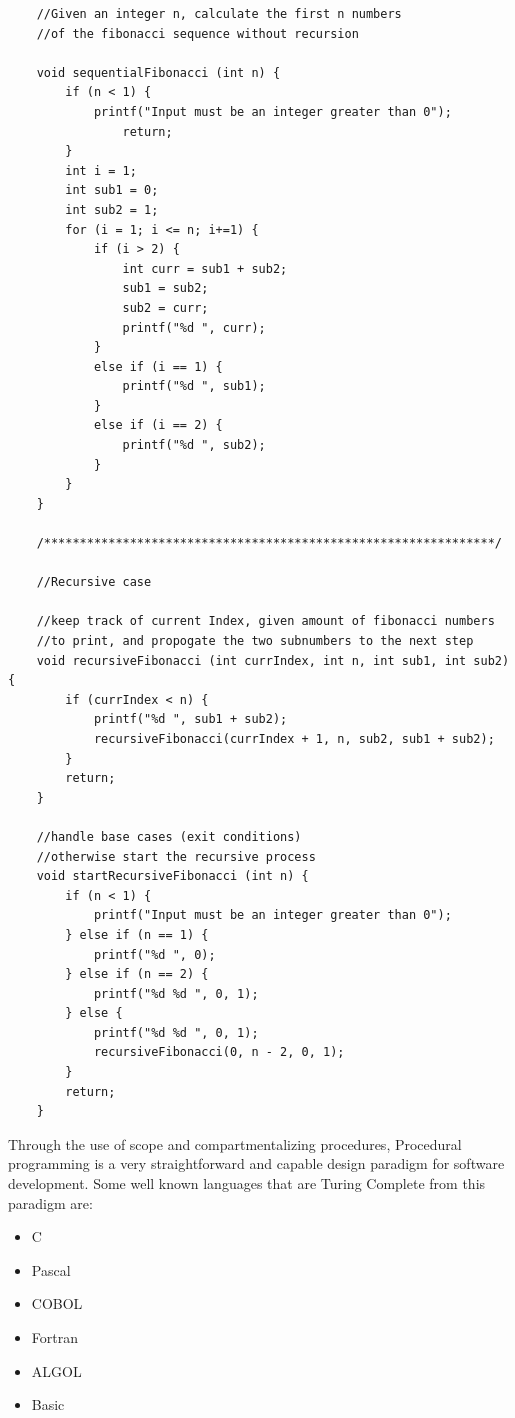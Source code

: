 \begin{verbatim}
    //Given an integer n, calculate the first n numbers
    //of the fibonacci sequence without recursion
    
    void sequentialFibonacci (int n) {
        if (n < 1) {
            printf("Input must be an integer greater than 0");
                return;
        }
        int i = 1;
        int sub1 = 0;
        int sub2 = 1;
        for (i = 1; i <= n; i+=1) {
            if (i > 2) {
                int curr = sub1 + sub2;
                sub1 = sub2;
                sub2 = curr;
                printf("%d ", curr);
            }
            else if (i == 1) {
                printf("%d ", sub1);
            }
            else if (i == 2) {
                printf("%d ", sub2);
            }
        }
    }

    /***************************************************************/

    //Recursive case

    //keep track of current Index, given amount of fibonacci numbers
    //to print, and propogate the two subnumbers to the next step
    void recursiveFibonacci (int currIndex, int n, int sub1, int sub2) {
        if (currIndex < n) {
            printf("%d ", sub1 + sub2);
            recursiveFibonacci(currIndex + 1, n, sub2, sub1 + sub2);
        }
        return;
    }

    //handle base cases (exit conditions)
    //otherwise start the recursive process
    void startRecursiveFibonacci (int n) {
        if (n < 1) {
            printf("Input must be an integer greater than 0");
        } else if (n == 1) {
            printf("%d ", 0);
        } else if (n == 2) {
            printf("%d %d ", 0, 1);
        } else {
            printf("%d %d ", 0, 1);
            recursiveFibonacci(0, n - 2, 0, 1);
        }
        return;
    }
\end{verbatim}

Through the use of scope and compartmentalizing procedures, Procedural programming is a very straightforward and capable design paradigm for software development.
Some well known languages that are Turing Complete from this paradigm are: 

\begin{itemize}
    \item C
    \item Pascal
    \item COBOL
    \item Fortran
    \item ALGOL
    \item Basic        
\end{itemize}


